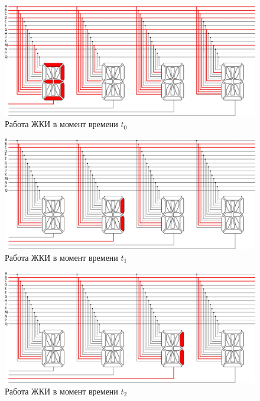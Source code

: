 \begin{figure}[H]
\begin{center}
\includegraphics[scale=0.28]{Image/28.jpg} 
\end{center}
\caption{Работа ЖКИ в момент времени $t_0$}\label{t0}
\end{figure}

\begin{figure}[H]
\begin{center}
\includegraphics[scale=0.28]{Image/29.jpg}
\end{center}
\caption{Работа ЖКИ в момент времени $t_1$}
\end{figure}


\begin{figure}[H]
\begin{center}
\includegraphics[scale=0.28]{Image/30.jpg}
\end{center}
\caption{Работа ЖКИ в момент времени $t_2$}
\end{figure}

